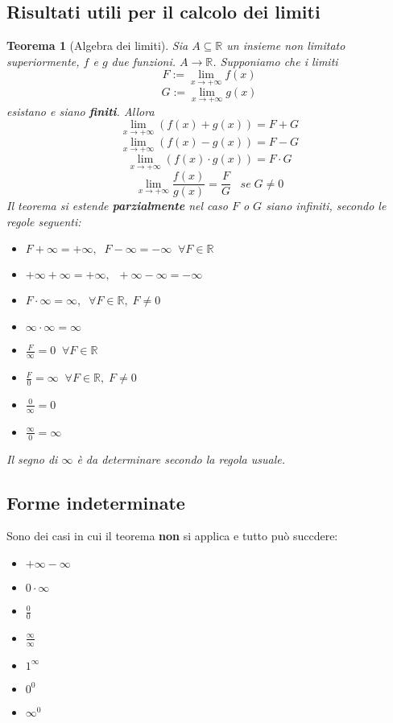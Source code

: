 \documentclass[a4paper]{article}
\newtheorem{theorem}{Teorema}
\theoremstyle{break}
\theoremstyle{break}
\theoremstyle{break}
\theoremstyle{break}
\begin{document}
\subsection{Risultati utili per il calcolo dei limiti}
\begin{theorem}[Algebra dei limiti]
	Sia \( A \subseteq \mathbb{R} \) un insieme non limitato superiormente, \( f \) e \( g \)
	due funzioni. \( A \to \mathbb{R} \). Supponiamo che i limiti
	\[
		F:= \lim_{x \to +\infty} f(x)
	\]
	\[
		G:= \lim_{x \to +\infty} g(x)
	\]
	esistano e siano \textbf{finiti}. Allora
	\[
		\lim_{x \to +\infty} (f(x) + g(x)) = F+G
	\]
	\[
		\lim_{x \to +\infty} (f(x) - g(x)) = F-G
	\]
	\[
		\lim_{x \to +\infty} (f(x) \cdot g(x)) = F \cdot G
	\]
	\[
		\lim_{x \to +\infty} \frac{f(x)}{g(x)} = \frac{F}{G}\;\;\;se\;G \neq 0
	\]
	Il teorema si estende \textbf{parzialmente} nel caso \( F \) o \( G \) siano infiniti, secondo
	le regole seguenti:
	\begin{itemize}
		\item \(
		      F + \infty = +\infty,\;\; F - \infty = -\infty\;\; \forall F \in \mathbb{R}
		      \)
		\item \(
		      +\infty + \infty = +\infty,\;\; +\infty - \infty = -\infty
		      \)
		\item \(
		      F \cdot \infty = \infty, \;\; \forall F \in \mathbb{R},\; F \neq 0
		      \)
		\item \(
		      \infty \cdot \infty = \infty
		      \)
		\item \(
		      \frac{F}{\infty} = 0 \;\; \forall F \in \mathbb{R}
		      \)
		\item \(
		      \frac{F}{0} = \infty \;\; \forall F \in \mathbb{R},\; F \neq 0
		      \)
		\item \(
		      \frac{0}{\infty} = 0
		      \)
		\item \(
		      \frac{\infty}{0} = \infty
		      \)
	\end{itemize}
	Il segno di \( \infty \) è da determinare secondo la regola usuale.
\end{theorem}


\subsection{Forme indeterminate}
Sono dei casi in cui il teorema \textbf{non} si applica e tutto può succdere:
\begin{itemize}
	\item \( +\infty - \infty \)
	\item \( 0 \cdot \infty \)
	\item \( \frac{0}{0} \)
	\item \( \frac{\infty}{\infty} \)
	\item \( 1^{\infty} \)
	\item \( 0^{0} \)
	\item \( \infty^{0} \)
\end{itemize}
\end{document}
